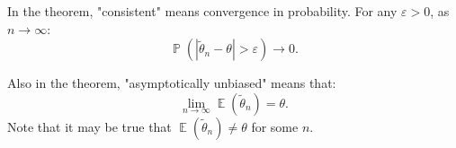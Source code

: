 \documentclass{huhtakm-template-book-v2}
\DeclareMathOperator{\prob}{\mathbb{P}}
\DeclareMathOperator{\E}{\mathbb{E}}
\begin{document}
    \begin{rem}
        In the theorem, "consistent" means convergence in probability. For any $\varepsilon > 0$, as $n \to \infty$:
        \begin{equation*}
            \prob(|\widetilde{\theta}_{n} - \theta| > \varepsilon) \to 0.
        \end{equation*}
    \end{rem}
    \begin{rem}
        Also in the theorem, "asymptotically unbiased" means that:
        \begin{equation*}
            \lim_{n \to \infty} \E(\widetilde{\theta}_{n}) = \theta.
        \end{equation*}
        Note that it may be true that $\E(\widetilde{\theta}_{n}) \neq \theta$ for some $n$.
    \end{rem}
\end{document}
